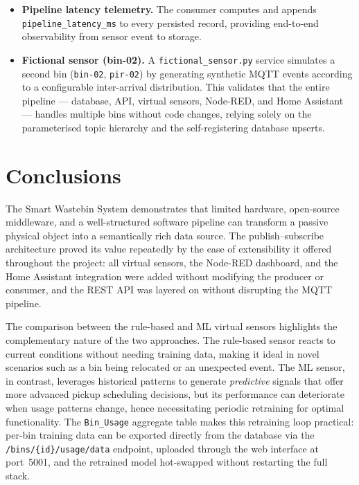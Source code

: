 \documentclass[10pt,a4paper]{article}
\begin{document}
\begin{itemize}
\item \textbf{Pipeline latency telemetry.} The consumer computes and appends
\texttt{pipeline\_latency\_ms} to every persisted record, providing
end-to-end observability from sensor event to storage.

\item \textbf{Fictional sensor (bin-02).} A \texttt{fictional\_sensor.py} service simulates a second bin (\texttt{bin-02}, \texttt{pir-02}) by generating synthetic MQTT events according to a configurable inter-arrival distribution. This validates that the entire pipeline --- database, API, virtual sensors, Node-RED, and Home Assistant --- handles multiple bins without code changes, relying solely on the parameterised topic hierarchy and the self-registering database upserts.
\end{itemize}

\section{Conclusions}

The Smart Wastebin System demonstrates that limited hardware, open-source
middleware, and a well-structured software pipeline can transform a passive physical
object into a semantically rich data source. The publish--subscribe architecture proved
its value repeatedly by the ease of extensibility it offered throughout the project: all virtual sensors, the Node-RED dashboard, and the Home Assistant integration were added without modifying the producer or consumer, and the REST API was layered on without disrupting the MQTT pipeline.

The comparison between the rule-based and ML virtual sensors highlights the complementary nature of the two approaches. The rule-based sensor
reacts to current conditions without needing training data, making it
ideal in novel scenarios such as a bin being relocated or an unexpected event.
The ML sensor, in contrast, leverages historical patterns to generate \textit{predictive} signals that offer more advanced pickup scheduling decisions, but its performance can deteriorate when usage patterns change, hence necessitating periodic retraining for optimal functionality. The \texttt{Bin\_Usage} aggregate table makes this retraining loop practical: per-bin training data can be exported directly from the database via the \texttt{/bins/\{id\}/usage/data} endpoint, uploaded through the web interface at port~5001, and the retrained model hot-swapped without restarting the full stack.
\end{document}
